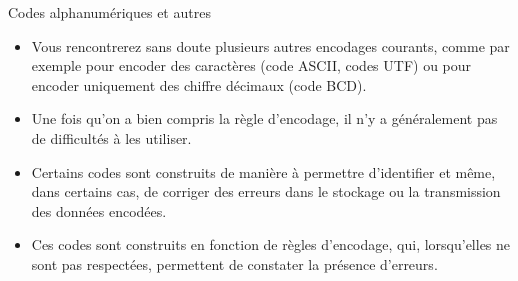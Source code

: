 \documentclass[presentation]{beamer}
\begin{document}
\begin{frame}[label={sec:org900d938}]{Codes alphanumériques et autres}
\begin{itemize}
\item Vous rencontrerez sans doute plusieurs autres encodages courants, comme par exemple pour encoder des caractères (code ASCII, codes UTF) ou pour encoder uniquement des chiffre décimaux (code BCD).

\item Une fois qu'on a bien compris la règle d'encodage, il n'y a généralement pas de difficultés à les utiliser.

\item Certains codes sont construits de manière à permettre d’identifier et même, dans certains cas, de corriger des erreurs dans le stockage ou la transmission des données encodées.

\item Ces codes sont construits en fonction de règles d'encodage, qui, lorsqu'elles ne sont pas respectées, permettent de constater la présence d'erreurs.
\end{itemize}
\end{frame}
\end{document}

